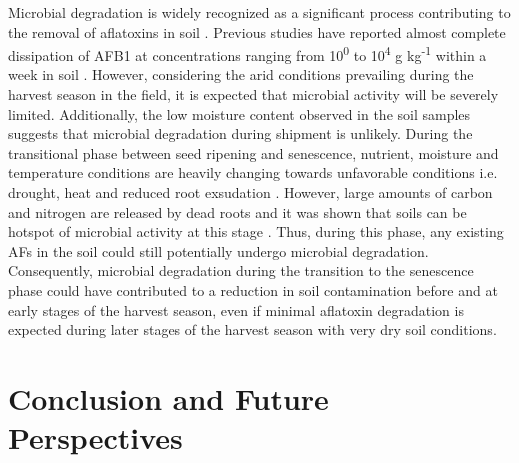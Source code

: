 \begin{refsection}
Microbial degradation is widely recognized as a significant process contributing to the removal of aflatoxins in soil \citep{fouche2020aflatoxins}. Previous studies have reported almost complete dissipation of AFB1 at concentrations ranging from 10\textsuperscript{0} to 10\textsuperscript{4} \textmu g kg\textsuperscript{-1}  within a week in soil \citep{angle1980decomposition, angle1986aflatoxin, accinelli2008aspergillus}. However, considering the arid conditions prevailing during the harvest season in the field, it is expected that microbial activity will be severely limited. Additionally, the low moisture content observed in the soil samples suggests that microbial degradation during shipment is unlikely. During the transitional phase between seed ripening and senescence, nutrient, moisture and temperature conditions are heavily changing towards unfavorable conditions i.e. drought, heat and reduced root exsudation \citep{zhalnina2018dynamic, cotta2013temporal}. However, large amounts of carbon and nitrogen are released by dead roots and it was shown that  soils can be hotspot of microbial activity at this stage \citep{spohn2014spatial}. Thus, during this phase, any existing AFs in the soil could still potentially undergo microbial degradation. Consequently, microbial degradation during the transition to the senescence phase could have contributed to a reduction in soil contamination before and at early stages of the harvest season, even if minimal aflatoxin degradation is expected during later stages of the harvest season with very dry soil conditions.

\section{Conclusion and Future Perspectives}


\end{refsection}
